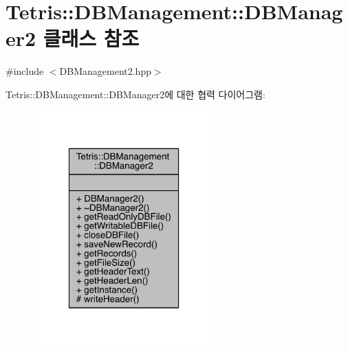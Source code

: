 \hypertarget{class_tetris_1_1_d_b_management_1_1_d_b_manager2}{}\section{Tetris\+:\+:D\+B\+Management\+:\+:D\+B\+Manager2 클래스 참조}
\label{class_tetris_1_1_d_b_management_1_1_d_b_manager2}


{\ttfamily \#include $<$D\+B\+Management2.\+hpp$>$}



Tetris\+:\+:D\+B\+Management\+:\+:D\+B\+Manager2에 대한 협력 다이어그램\+:
\nopagebreak
\begin{figure}[H]
\begin{center}
\leavevmode
\includegraphics[width=198pt]{class_tetris_1_1_d_b_management_1_1_d_b_manager2__coll__graph}
\end{center}
\end{figure}
